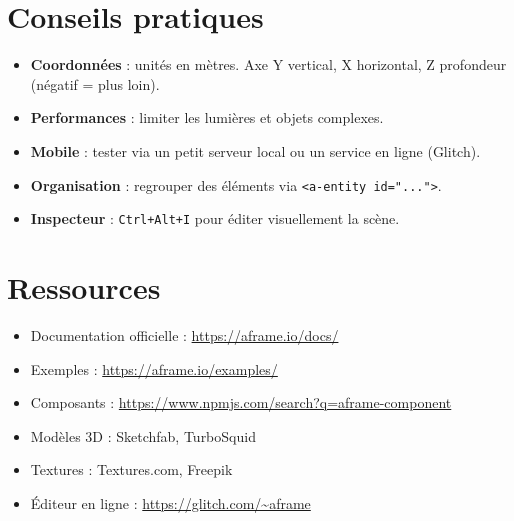 \documentclass[12pt]{article}
\begin{document}
\section{Conseils pratiques}
\begin{itemize}
    \item \textbf{Coordonnées} : unités en mètres. Axe Y vertical, X horizontal, Z profondeur (négatif = plus loin).
    \item \textbf{Performances} : limiter les lumières et objets complexes.
    \item \textbf{Mobile} : tester via un petit serveur local ou un service en ligne (Glitch).
    \item \textbf{Organisation} : regrouper des éléments via \texttt{<a-entity id="...">}.
    \item \textbf{Inspecteur} : \texttt{Ctrl+Alt+I} pour éditer visuellement la scène.
\end{itemize}

\section{Ressources}
\begin{itemize}
    \item Documentation officielle : \url{https://aframe.io/docs/}
    \item Exemples : \url{https://aframe.io/examples/}
    \item Composants : \url{https://www.npmjs.com/search?q=aframe-component}
    \item Modèles 3D : Sketchfab, TurboSquid
    \item Textures : Textures.com, Freepik
    \item Éditeur en ligne : \url{https://glitch.com/~aframe}
\end{itemize}
\end{document}
